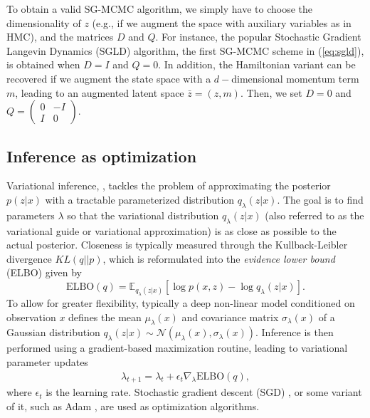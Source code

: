 To obtain a valid SG-MCMC algorithm, we simply have to choose the dimensionality of ${z}$ (e.g., if we augment the space with auxiliary variables as in HMC), and the matrices ${D}$ and ${Q}$. For instance, the popular Stochastic Gradient Langevin Dynamics (SGLD) algorithm, the first SG-MCMC scheme in (\ref{eq:sgld}), is obtained when ${D} = {I}$ and ${Q} = {0}$. In addition, the Hamiltonian variant can be recovered if we augment the state space with a $d-$dimensional momentum term ${m}$, leading to an augmented latent space $ \bar{{z}} = ({z}, {m})$. Then, we set ${D} = {0}$ and ${Q} = \begin{pmatrix}
{0} & -{I} \\
{I} & {0}
\end{pmatrix}$.


\subsection{Inference as optimization}\label{sec:iasopt}


Variational inference, \cite{kucukelbir2017automatic}, tackles the problem of approximating the posterior $p({z} | {x})$ with a tractable parameterized distribution $q_{{\lambda}}({z}|{x})$. The goal is to find parameters ${\lambda}$ so that the variational distribution $q_{{\lambda}}({z}|{x})$ (also referred to as the variational guide or variational approximation) is as close as possible to the actual posterior. Closeness is typically measured through the
Kullback-Leibler 
divergence $KL(q || p)$, which is reformulated into the \emph{evidence lower bound} (ELBO) given by
\begin{equation}\label{eq:elbo}
\mbox{ELBO}(q) = \mathbb{E}_{q_{{\lambda}}({z}|{x})} \left[ \log p({x},{z}) - \log q_{{\lambda}}({z}|{x})\right].
\end{equation}
To allow 
for greater flexibility, typically a deep non-linear model conditioned on observation ${x}$ defines the mean $\mu_{{\lambda}}({x})$ and covariance matrix $\sigma_{{\lambda}}({x})$ of a
Gaussian distribution $q_{{\lambda}}({z}|{x}) \sim \mathcal{N}(\mu_{{\lambda}}({x}), \sigma_{{\lambda}}({x}))$.
Inference is then performed using a gradient-based maximization routine, leading to variational parameter updates
\begin{align*}
{\lambda}_{t+1} = {\lambda}_t +  \epsilon_t \nabla_{{\lambda}} \mbox{ELBO}(q),
\end{align*}
where $\epsilon_t$ is the learning rate. Stochastic gradient descent (SGD) \cite{hoffman2013stochastic}, or some variant of it, such as Adam \cite{kingma2014adam}, are used as optimization algorithms.

